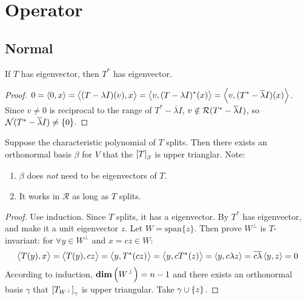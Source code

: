 \section{Operator}

\subsection{Normal}

\begin{theorem}\label{eigenvectorforadjointoperator}
    If $T$ has eigenvector, then $T^*$ has eigenvector.    
\end{theorem}
\begin{proof}
    $0 = \left\langle \displaystyle 0, x \right\rangle = \left\langle \displaystyle (T - \lambda I)(v), x \right\rangle = \left\langle \displaystyle v, (T - \lambda I)^* (x) \right\rangle = \left\langle \displaystyle v, (T^* - \overline{\lambda} I)(x) \right\rangle$. Since $v \neq 0$ is reciprocal to the range of $T^* - \overline{\lambda} I$, $v \notin \mathcal{R}(T^* - \overline{\lambda} I)$, so $\mathcal{N}(T^* - \overline{\lambda} I) \neq \{ 0 \}$.
\end{proof}

\begin{theorem}\label{schurincomplexfield}
    Suppose the characteristic polynomial of $T$ splits. Then there exists an orthonormal basis $\beta$ for $V$ that the $\coordinate{T}_\beta$ is upper trianglar. Note:
    \begin{enumerate}
        \item $\beta$ does \emph{not} need to be eigenvectors of $T$.
        \item It works in $\mathcal{R}$ as long as $T$ splits.
    \end{enumerate} 
\end{theorem}
\begin{proof}
    Use induction. Since $T$ splits, it has a eigenvector. By  $T^*$ has eigenvector, and make it a unit eigenvector $z$. Let $W = \text{span}\{z\}$. Then prove $W^\bot$ is $T$-invariant: for $\forall y \in W^\bot$ and $x = cz \in W$:
    \begin{equation*}
        \begin{aligned}
            \left\langle \displaystyle T(y), x \right\rangle = \left\langle \displaystyle T(y), cz \right\rangle = \left\langle \displaystyle y, T^*(cz) \right\rangle = \left\langle \displaystyle y, cT^*(z) \right\rangle = \left\langle \displaystyle y, c \lambda z \right\rangle = \overline{c\lambda} \left\langle \displaystyle y, z \right\rangle = 0
        \end{aligned}
    \end{equation*}
    According to induction, $\displaystyle \mathbf{dim}\left( W^\bot \right) = n - 1$ and there exists an orthonormal basis $\gamma$ that $\coordinate{T_{W^\bot}}_\gamma$ is upper triangular. Take $\gamma \cup \set{z}$.
\end{proof}

